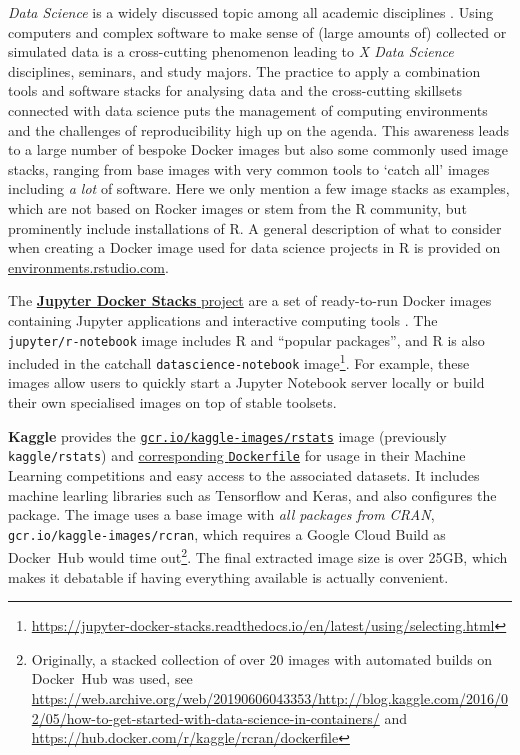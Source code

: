 \label{datascience}

\emph{Data Science} is a widely discussed topic among all academic
disciplines \citep[cf. e.g.,][]{donoho_50_2017}. Using computers and
complex software to make sense of (large amounts of) collected or
simulated data is a cross-cutting phenomenon leading to \emph{X Data
Science} disciplines, seminars, and study majors. The practice to apply
a combination tools and software stacks for analysing data and the
cross-cutting skillsets connected with data science puts the management
of computing environments and the challenges of reproducibility high up
on the agenda. This awareness leads to a large number of bespoke Docker
images but also some commonly used image stacks, ranging from base
images with very common tools to `catch all' images including \emph{a
lot} of software. Here we only mention a few image stacks as examples,
which are not based on Rocker images or stem from the R community, but
prominently include installations of R. A general description of what to
consider when creating a Docker image used for data science projects in
R is provided on
\href{https://environments.rstudio.com/docker}{environments.rstudio.com}.

The \href{https://github.com/jupyter/docker-stacks/}{\textbf{Jupyter
Docker Stacks} project} are a set of ready-to-run Docker images
containing Jupyter applications and interactive computing tools
\citep{project_jupyter_jupyter_2018}. The \texttt{jupyter/r-notebook}
image includes R and ``popular packages'', and R is also included in the
catchall \texttt{datascience-notebook}
image\footnote{\href{https://jupyter-docker-stacks.readthedocs.io/en/latest/using/selecting.html}{https://jupyter-docker-stacks.readthedocs.io/en/latest/using/selecting.html}}.
For example, these images allow users to quickly start a Jupyter
Notebook server locally or build their own specialised images on top of
stable toolsets.

\textbf{Kaggle} provides the
\href{https://hub.docker.com/r/kaggle/rstats}{\texttt{gcr.io/kaggle-images/rstats}}
image (previously \texttt{kaggle/rstats}) and
\href{https://github.com/Kaggle/docker-rstats}{corresponding
\texttt{Dockerfile}} for usage in their Machine Learning competitions
and easy access to the associated datasets. It includes machine learling
libraries such as Tensorflow and Keras, and also configures the
 package. The image uses a base image with \emph{all
packages from CRAN}, \texttt{gcr.io/kaggle-images/rcran}, which requires
a Google Cloud Build as Docker~Hub would time
out\footnote{Originally, a stacked collection of over 20 images with automated builds on Docker~Hub was used, see \href{https://web.archive.org/web/20190606043353/http://blog.kaggle.com/2016/02/05/how-to-get-started-with-data-science-in-containers/}{https://web.archive.org/web/20190606043353/http://blog.kaggle.com/2016/02/05/how-to-get-started-with-data-science-in-containers/} and \href{https://hub.docker.com/r/kaggle/rcran/dockerfile}{https://hub.docker.com/r/kaggle/rcran/dockerfile}}.
The final extracted image size is over 25GB, which makes it debatable if
having everything available is actually convenient.


